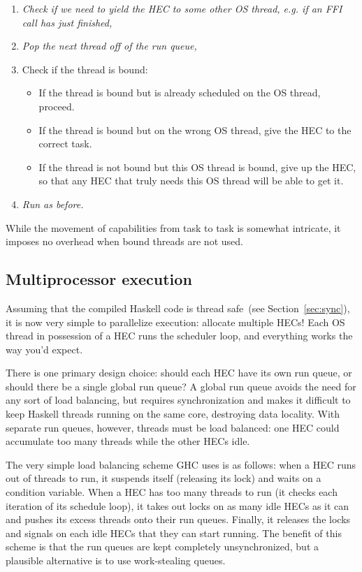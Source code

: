 \begin{enumerate}
    \item \emph{Check if we need to yield the HEC to some other OS thread, e.g. if an FFI call has just finished,}
    \item \emph{Pop the next thread off of the run queue,}
    \item Check if the thread is bound:
        \begin{itemize}
            \item If the thread is bound but is already scheduled on the OS thread, proceed.
            \item If the thread is bound but on the wrong OS thread, give the HEC to the correct task.
            \item If the thread is not bound but this OS thread is bound, give up the HEC, so that any HEC that truly needs this OS thread will be able to get it.
        \end{itemize}
    \item \emph{Run as before.}
\end{enumerate}

While the movement of capabilities from task to task is somewhat intricate,
it imposes no overhead when bound threads are not used.

\subsection{Multiprocessor execution}

Assuming that the compiled Haskell code is thread safe~(see
Section~\ref{sec:sync}), it is now very simple to parallelize execution:
allocate multiple HECs!  Each OS thread in possession of a
HEC runs the scheduler loop, and everything works the way you'd
expect.

There is one primary design choice: should each HEC have its own
run queue, or should there be a single global run queue?  A global run
queue avoids the need for any sort of load balancing, but requires
synchronization and makes it difficult to keep Haskell threads running on
the same core, destroying data locality.  With separate run queues, however,
threads must be load balanced: one HEC could accumulate too many
threads while the other HECs idle.

The very simple load balancing scheme GHC uses is as follows: when a
HEC runs out of threads to run, it suspends itself (releasing its
lock) and waits on a condition variable.  When a HEC has too many
threads to run (it checks each iteration of its schedule loop), it takes
out locks on as many idle HECs as it can and pushes its excess
threads onto their run queues.  Finally, it releases the locks and
signals on each idle HECs that they can start running.  The
benefit of this scheme is that the run queues are kept completely
unsynchronized, but a plausible alternative is to use work-stealing
queues.

